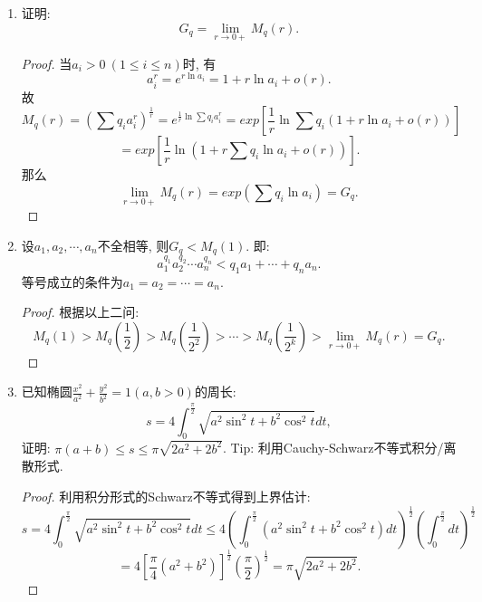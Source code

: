 \documentclass[UTF8,11pt, a4paper, oneside, fontset=none]{ctexbook}
\begin{document}
\begin{enumerate}
\begin{proof}

应用C-S不等式即可:
\[
M_q\left(\frac{r}{2}\right) = \left(\sum q_i a_i^{\frac{r}{2}}\right)^{\frac{2}{r}} = \left(\sum \sqrt{q_i} \sqrt{q_i} a_i^{\frac{r}{2}}\right)^{\frac{2}{r}} < \left(\sum q_i \sum q_i a_i^{r}\right)^{\frac{1}{r}} = M_q(r).
\]

\end{proof}


\item 证明:
\[
G_q = \lim_{r \to 0+} M_q(r).
\]


\begin{proof}

当$a_i >0 \ (1 \leq i \leq n)$时, 有
\[
a_i^r = e^{r \ln a_i} = 1 + r \ln a_i + o(r).
\]
故
\[
M_q(r) =  \left( \sum q_i a_i^r \right)^{\frac{1}{r}} = e^{\frac{1}{r} \ln \sum q_i a_i^r} = exp\left[ \frac{1}{r} \ln \sum q_i (1 + r \ln a_i + o(r)) \right]
\]
\[
= exp\left[ \frac{1}{r} \ln (1 + r \sum q_i \ln a_i + o(r)) \right].
\]
那么
\[
\lim_{r \to 0+}M_q(r) = exp\left( \sum q_i \ln a_i \right) = G_q.
\]

\end{proof}


\item 设$a_1, a_2, \cdots, a_n$不全相等, 则$G_q < M_q(1)$. 即:
\[
a_1^{q_1} a_2^{q_2} \cdots a_n^{q_n} < q_1 a_1 + \cdots + q_n a_n.
\]
等号成立的条件为$a_1 = a_2 = \cdots = a_n$.


\begin{proof}

根据以上二问:
\[
M_q(1) > M_q(\frac{1}{2}) >  M_q(\frac{1}{2^2}) > \cdots > M_q(\frac{1}{2^k}) > \lim_{r \to 0+} M_q(r) = G_q.
\]

\end{proof}



\item 已知椭圆$\frac{x^2}{a^2} + \frac{y^2}{b^2} =1 (a, b >0)$的周长:
\[
s = 4 \int_0^{\frac{\pi}{2}} \sqrt{a^2 \sin^2 t + b^2 \cos^2 t} dt,
\]
证明: $\pi(a+b) \leq s \leq \pi \sqrt{2a^2 + 2b^2}$. Tip: 利用Cauchy-Schwarz不等式积分/离散形式.


\begin{proof}


利用积分形式的Schwarz不等式得到上界估计:
\[
s = 4 \int_0^{\frac{\pi}{2}} \sqrt{a^2 \sin^2 t + b^2 \cos^2 t} dt \leq 4 \left( \int_0^{\frac{\pi}{2}} (a^2 \sin^2 t + b^2 \cos^2 t) dt  \right)^{\frac{1}{2}}  \left( \int_0^{\frac{\pi}{2}} dt \right)^{\frac{1}{2}} 
\]
\[
= 4 \left[ \frac{\pi}{4} (a^2 + b^2) \right]^{\frac{1}{2}} \left( \frac{\pi}{2} \right)^{\frac{1}{2}} = \pi \sqrt{2a^2 + 2b^2}.
\]



\end{proof}
\end{enumerate}
\end{document}

